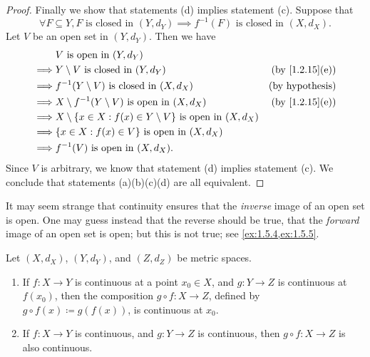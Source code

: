 \begin{proof}
  Finally we show that statements (d) implies statement (c).
  Suppose that
  \[
    \forall F \subseteq Y, F \text{ is closed in } (Y, d_Y) \implies f^{-1}(F) \text{ is closed in } (X, d_X).
  \]
  Let \(V\) be an open set in \((Y, d_Y)\).
  Then we have
  \begin{align*}
             & V \text{ is open in } (Y, d_Y)                                                                               \\
    \implies & Y \setminus V \text{ is closed in } (Y, d_Y)                                  & \text{(by \cref{1.2.15}(e))} \\
    \implies & f^{-1}(Y \setminus V) \text{ is closed in } (X, d_X)                          & \text{(by hypothesis)}       \\
    \implies & X \setminus f^{-1}(Y \setminus V) \text{ is open in } (X, d_X)                & \text{(by \cref{1.2.15}(e))} \\
    \implies & X \setminus \{x \in X : f(x) \in Y \setminus V\} \text{ is open in } (X, d_X)                                \\
    \implies & \{x \in X : f(x) \in V\} \text{ is open in } (X, d_X)                                                        \\
    \implies & f^{-1}(V) \text{ is open in } (X, d_X).
  \end{align*}
  Since \(V\) is arbitrary, we know that statement (d) implies statement (c).
  We conclude that statements (a)(b)(c)(d) are all equivalent.
\end{proof}

\begin{rmk}\label{2.1.6}
  It may seem strange that continuity ensures that the \emph{inverse} image of an open set is open.
  One may guess instead that the reverse should be true, that the \emph{forward} image of an open set is open;
  but this is not true;
  see \cref{ex:1.5.4,ex:1.5.5}.
\end{rmk}

\begin{cor}\label{2.1.7}
  Let \((X, d_X)\), \((Y, d_Y)\), and \((Z, d_Z)\) be metric spaces.
  \begin{enumerate}
    \item If \(f : X \to Y\) is continuous at a point \(x_0 \in X\), and \(g : Y \to Z\) is continuous at \(f(x_0)\), then the composition \(g \circ f : X \to Z\), defined by \(g \circ f(x) \coloneqq g(f(x))\), is continuous at \(x_0\).
    \item If \(f : X \to Y\) is continuous, and \(g : Y \to Z\) is continuous, then \(g \circ f : X \to Z\) is also continuous.
  \end{enumerate}
\end{cor}

